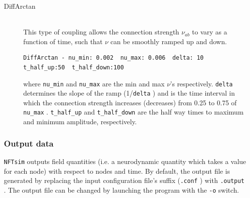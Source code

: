\documentclass[12pt,a4paper]{article}
\newcommand{\type}[1]{{\small\small\tt #1} }
\newcommand{\NF}[0]{\type{NFTsim}}
\begin{document}
\begin{itemize}
\begin{description}
    \item[DiffArctan]\ \\
    This type of coupling allows the connection strength $\nu_{ab}$ to vary as a function of time, such that $\nu$ can be smoothly ramped up and down.
    \begin{lstlisting}
DiffArctan - nu_min: 0.002  nu_max: 0.006  delta: 10  t_half_up:50  t_half_down:100
    \end{lstlisting}
where \type{nu\_min} and \type{nu\_max} are the min and max $\nu$'s respectively. \type{delta} determines the slope of the ramp (1/\type{delta}) and is the time interval in which the connection strength increases (decreases) from 0.25 to 0.75 of \type{nu\_max}. \type{t\_half\_up} and \type{t\_half\_down} are the half way times to maximum and minimum  amplitude, respectively.

\end{description}
\end{itemize}

\subsubsection{Output data}
\label{sec:output_conf}

\NF outputs field quantities (i.e. a neurodynamic quantity which takes a value for each node) with respect to nodes and time. By default, the output file is generated by replacing the input configuration file's suffix (\type{.conf}) with \type{.output}. The output file can be changed by launching the program with the \type{-o} switch.
\end{document}
